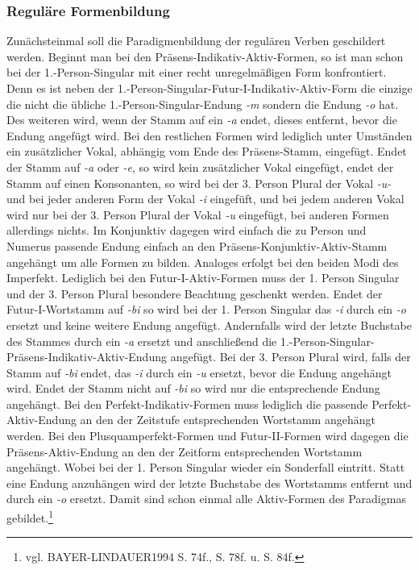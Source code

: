 \documentclass[12pt,abstract=on,titlepage,bibliography=totoc,ngerman,listof=totoc]{scrreprt}
\begin{document}
\subsubsection{Reguläre Formenbildung}
Zunächsteinmal soll die Paradigmenbildung der regulären Verben geschildert werden. Beginnt man bei den Präsens-Indikativ-Aktiv-Formen, so ist man schon bei der 1.-Person-Singular mit einer recht unregelmäßigen Form konfrontiert. Denn es ist neben der 1.-Person-Singular-Futur-I-Indikativ-Aktiv-Form die einzige die nicht die übliche 1.-Person-Singular-Endung \textit{-m} sondern die Endung \textit{-o} hat. Des weiteren wird, wenn der Stamm auf ein \textit{-a} endet, dieses entfernt, bevor die Endung angefügt wird. Bei den restlichen Formen wird lediglich unter Umständen ein zusätzlicher Vokal, abhängig vom Ende des Präsens-Stamm, eingefügt. Endet der Stamm auf \textit{-a} oder \textit{-e}, so wird kein zusätzlicher Vokal eingefügt, endet der Stamm auf einen Konsonanten, so wird bei der 3. Person Plural der Vokal \textit{-u-} und bei jeder anderen Form der Vokal \textit{-i} eingefüft, und bei jedem anderen Vokal wird nur bei der 3. Person Plural der Vokal \textit{-u} eingefügt, bei anderen Formen allerdings nichts. Im Konjunktiv dagegen wird einfach die zu Person und Numerus passende Endung einfach an den Präsens-Konjunktiv-Aktiv-Stamm angehängt um alle Formen zu bilden. Analoges erfolgt bei den beiden Modi des Imperfekt. Lediglich bei den Futur-I-Aktiv-Formen muss der 1. Person Singular und der 3. Person Plural besondere Beachtung geschenkt werden. Endet der Futur-I-Wortstamm auf \textit{-bi} so wird bei der 1. Person Singular das \textit{-i} durch ein \textit{-o} ersetzt und keine weitere Endung angefügt. Andernfalls wird der letzte Buchstabe des Stammes durch ein \textit{-a} ersetzt und anschließend die 1.-Person-Singular-Präsens-Indikativ-Aktiv-Endung angefügt. Bei der 3. Person Plural wird, falls der Stamm auf \textit{-bi} endet, das \textit{-i} durch ein \textit{-u} ersetzt, bevor die Endung angehängt wird. Endet der Stamm nicht auf \textit{-bi} so wird nur die entsprechende Endung angehängt. Bei den Perfekt-Indikativ-Formen muss lediglich die passende Perfekt-Aktiv-Endung an den der Zeitstufe entsprechenden Wortstamm angehängt werden. Bei den Plusquamperfekt-Formen und Futur-II-Formen wird dagegen die Präsens-Aktiv-Endung an den der Zeitform entsprechenden Wortstamm angehängt. Wobei bei der 1. Person Singular wieder ein Sonderfall eintritt. Statt eine Endung anzuhängen wird der letzte Buchstabe des Wortstamms entfernt und durch ein \textit{-o} ersetzt. Damit sind schon einmal alle Aktiv-Formen des Paradigmas gebildet.\footnote{vgl. BAYER-LINDAUER1994 S. 74f., S. 78f. u. S. 84f.} \par
\end{document}
